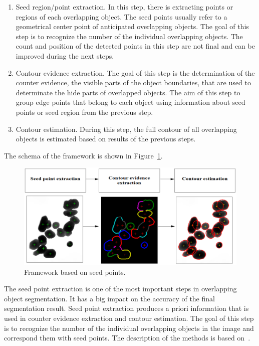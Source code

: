 \documentclass{lutmscthesis}[2010/09/22]
\begin{document}
\begin{enumerate}
\item Seed region/point extraction. In this step, there is extracting points or regions of each overlapping object. The seed points usually refer to a geometrical center point of anticipated overlapping objects. The goal of this step is to recognize the number of the individual overlapping objects. The count and position of the detected points in this step are not final and can be improved during the next steps.
\item Contour evidence extraction. The goal of this step is the determination of the counter evidence, the visible parts of the object boundaries, that are used to determinate the hide parts of overlapped objects. The aim of this step to group edge points that belong to each object using information about seed points or seed region from the previous step.
\item Contour estimation. During this step, the full contour of all overlapping objects is estimated based on results of the previous steps.
\end{enumerate}


The schema of the framework is shown in Figure~\ref{fig:general_framework}.

\begin{figure}[ht]
  \includegraphics[width=\linewidth]{General_framework.png}
  \caption{Framework based on seed points.~\cite{zafari-thesis}}
  \label{fig:general_framework}
\end{figure}

The seed point extraction is one of the most important steps in overlapping object segmentation. It has a big impact on the accuracy of the final segmentation result. Seed point extraction produces a priori information that is used in counter evidence extraction and contour estimation. The goal of this step is to recognize the number of the individual overlapping objects in the image and correspond them with seed points. The description of the methods is based on~\cite{zafari-thesis}.
\end{document}
